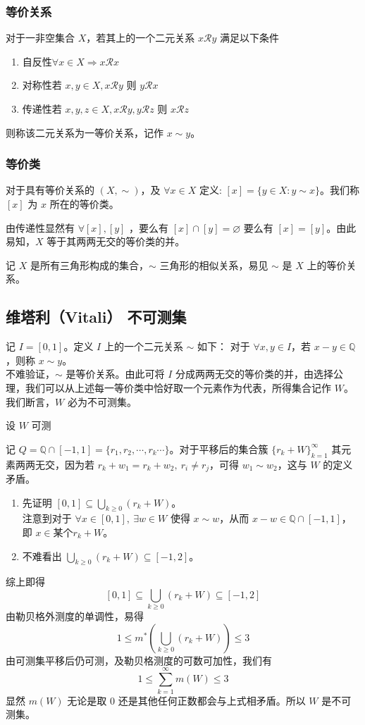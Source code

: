 \documentclass{ctexbook}
\newcommand{\no}{\noindent}
\newcommand{\pro}{\no{\bf 证明：}}
\newcommand{\EXP}{\no {\bf 例}\quad}
\newcommand{\ITEMS}{\begin{enumerate}[leftmargin=4em]}
\newcommand{\ITEME}{\end{enumerate}}
\begin{document}
\subsubsection{等价关系}
对于一非空集合 $X$，若其上的一个二元关系 $x\mathcal{R} y$ 满足以下条件
\ITEMS
	\item 自反性\quad $\forall x\in X \Rightarrow x\mathcal{R}x$
	\item 对称性\quad 若 $x,y\in X , x\mathcal{R}y$ 则 $y\mathcal{R}x$
	\item 传递性\quad 若 $x,y,z\in X , x\mathcal{R}y, y\mathcal{R}z$ 则 $x\mathcal{R}z$
\ITEME 
则称该二元关系为一等价关系，记作 $x\sim y$。

\subsubsection{等价类}
对于具有等价关系的 $(X,\sim)$，及 $\forall x\in X$ 定义: $[x] = \{y\in X:y\sim x\}$。我们称
$[x]$ 为 $x$ 所在的等价类。

\smallskip

由传递性显然有 $\forall [x],[y]$ ，要么有 $[x] \cap [y] = \varnothing$ 要么有 $[x] = [y]$。由此易知，$X$ 等于其两两无交的等价类的并。

\EXP 记 $X$ 是所有三角形构成的集合，$\sim$ 三角形的相似关系，易见 $\sim$ 是 $X$ 上的等价关系。

\subsection{维塔利（Vitali） 不可测集}
记 $I = [0,1]$。定义 $I$ 上的一个二元关系 $\sim$ 如下：
对于 $\forall x,y \in I$，若 $x-y \in \mathbb{Q}$，则称 $x\sim y$。\\
不难验证，$\sim$ 是等价关系。由此可将 $I$ 分成两两无交的等价类的并，由选择公理，我们可以从上述每一等价类中恰好取一个元素作为代表，所得集合记作 $W$。我们断言，$W$ 必为不可测集。
\smallskip

\pro 设 $W$ 可测

记 $Q = \mathbb{Q} \cap [-1,1] = \{r_1,r_2,\cdots,r_k\cdots\}$。对于平移后的集合簇 $\{r_k + W\}_{k=1}^\infty$ 其元素两两无交，因为若 $r_k + w_1 = r_k + w_2,\ r_i \neq r_j$，可得 $w_1 \sim w_2$，这与 $W$ 的定义矛盾。

\ITEMS 
	\item 先证明 $[0,1] \subseteq \bigcup_{k\ge 0} (r_k + W)$。\\
    注意到对于 $\forall x \in [0,1], \ \exists w \in W$ 使得 $x \sim w$，从而 $x-w \in \mathbb{Q} \cap [-1,1]$，
即 $x \in \mbox{某个}r_k + W$。
	\item 不难看出 $\bigcup_{k\ge 0} (r_k + W) \subseteq [-1,2]$。
\ITEME
综上即得	
\[
	[0,1] \subseteq \bigcup_{k\ge 0} (r_k + W) \subseteq [-1,2]
\]
由勒贝格外测度的单调性，易得
\[
	1 \le m^*\left(\bigcup_{k\ge 0} (r_k + W)\right) \le 3
\]
由可测集平移后仍可测，及勒贝格测度的可数可加性，我们有
\[
	1 \le \sum_{k=1}^\infty m(W) \le 3
\]
显然 $m(W)$ 无论是取 $0$ 还是其他任何正数都会与上式相矛盾。所以 $W$ 是不可测集。\\
\end{document}
